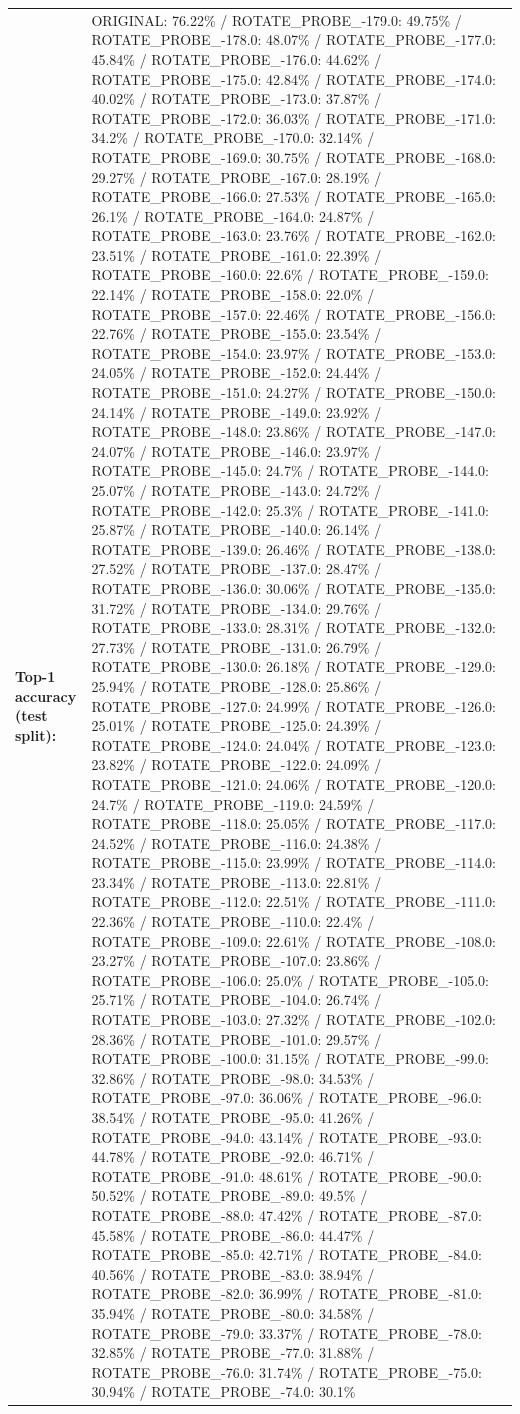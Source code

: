 \documentclass[parskip=half]{scrartcl}
\begin{document}
\begin{tabular}{l|l}
        \textbf{Top-1 accuracy (test split):} & ORIGINAL: 76.22\% / ROTATE_PROBE_-179.0: 49.75\% / ROTATE_PROBE_-178.0: 48.07\% / ROTATE_PROBE_-177.0: 45.84\% / ROTATE_PROBE_-176.0: 44.62\% / ROTATE_PROBE_-175.0: 42.84\% / ROTATE_PROBE_-174.0: 40.02\% / ROTATE_PROBE_-173.0: 37.87\% / ROTATE_PROBE_-172.0: 36.03\% / ROTATE_PROBE_-171.0: 34.2\% / ROTATE_PROBE_-170.0: 32.14\% / ROTATE_PROBE_-169.0: 30.75\% / ROTATE_PROBE_-168.0: 29.27\% / ROTATE_PROBE_-167.0: 28.19\% / ROTATE_PROBE_-166.0: 27.53\% / ROTATE_PROBE_-165.0: 26.1\% / ROTATE_PROBE_-164.0: 24.87\% / ROTATE_PROBE_-163.0: 23.76\% / ROTATE_PROBE_-162.0: 23.51\% / ROTATE_PROBE_-161.0: 22.39\% / ROTATE_PROBE_-160.0: 22.6\% / ROTATE_PROBE_-159.0: 22.14\% / ROTATE_PROBE_-158.0: 22.0\% / ROTATE_PROBE_-157.0: 22.46\% / ROTATE_PROBE_-156.0: 22.76\% / ROTATE_PROBE_-155.0: 23.54\% / ROTATE_PROBE_-154.0: 23.97\% / ROTATE_PROBE_-153.0: 24.05\% / ROTATE_PROBE_-152.0: 24.44\% / ROTATE_PROBE_-151.0: 24.27\% / ROTATE_PROBE_-150.0: 24.14\% / ROTATE_PROBE_-149.0: 23.92\% / ROTATE_PROBE_-148.0: 23.86\% / ROTATE_PROBE_-147.0: 24.07\% / ROTATE_PROBE_-146.0: 23.97\% / ROTATE_PROBE_-145.0: 24.7\% / ROTATE_PROBE_-144.0: 25.07\% / ROTATE_PROBE_-143.0: 24.72\% / ROTATE_PROBE_-142.0: 25.3\% / ROTATE_PROBE_-141.0: 25.87\% / ROTATE_PROBE_-140.0: 26.14\% / ROTATE_PROBE_-139.0: 26.46\% / ROTATE_PROBE_-138.0: 27.52\% / ROTATE_PROBE_-137.0: 28.47\% / ROTATE_PROBE_-136.0: 30.06\% / ROTATE_PROBE_-135.0: 31.72\% / ROTATE_PROBE_-134.0: 29.76\% / ROTATE_PROBE_-133.0: 28.31\% / ROTATE_PROBE_-132.0: 27.73\% / ROTATE_PROBE_-131.0: 26.79\% / ROTATE_PROBE_-130.0: 26.18\% / ROTATE_PROBE_-129.0: 25.94\% / ROTATE_PROBE_-128.0: 25.86\% / ROTATE_PROBE_-127.0: 24.99\% / ROTATE_PROBE_-126.0: 25.01\% / ROTATE_PROBE_-125.0: 24.39\% / ROTATE_PROBE_-124.0: 24.04\% / ROTATE_PROBE_-123.0: 23.82\% / ROTATE_PROBE_-122.0: 24.09\% / ROTATE_PROBE_-121.0: 24.06\% / ROTATE_PROBE_-120.0: 24.7\% / ROTATE_PROBE_-119.0: 24.59\% / ROTATE_PROBE_-118.0: 25.05\% / ROTATE_PROBE_-117.0: 24.52\% / ROTATE_PROBE_-116.0: 24.38\% / ROTATE_PROBE_-115.0: 23.99\% / ROTATE_PROBE_-114.0: 23.34\% / ROTATE_PROBE_-113.0: 22.81\% / ROTATE_PROBE_-112.0: 22.51\% / ROTATE_PROBE_-111.0: 22.36\% / ROTATE_PROBE_-110.0: 22.4\% / ROTATE_PROBE_-109.0: 22.61\% / ROTATE_PROBE_-108.0: 23.27\% / ROTATE_PROBE_-107.0: 23.86\% / ROTATE_PROBE_-106.0: 25.0\% / ROTATE_PROBE_-105.0: 25.71\% / ROTATE_PROBE_-104.0: 26.74\% / ROTATE_PROBE_-103.0: 27.32\% / ROTATE_PROBE_-102.0: 28.36\% / ROTATE_PROBE_-101.0: 29.57\% / ROTATE_PROBE_-100.0: 31.15\% / ROTATE_PROBE_-99.0: 32.86\% / ROTATE_PROBE_-98.0: 34.53\% / ROTATE_PROBE_-97.0: 36.06\% / ROTATE_PROBE_-96.0: 38.54\% / ROTATE_PROBE_-95.0: 41.26\% / ROTATE_PROBE_-94.0: 43.14\% / ROTATE_PROBE_-93.0: 44.78\% / ROTATE_PROBE_-92.0: 46.71\% / ROTATE_PROBE_-91.0: 48.61\% / ROTATE_PROBE_-90.0: 50.52\% / ROTATE_PROBE_-89.0: 49.5\% / ROTATE_PROBE_-88.0: 47.42\% / ROTATE_PROBE_-87.0: 45.58\% / ROTATE_PROBE_-86.0: 44.47\% / ROTATE_PROBE_-85.0: 42.71\% / ROTATE_PROBE_-84.0: 40.56\% / ROTATE_PROBE_-83.0: 38.94\% / ROTATE_PROBE_-82.0: 36.99\% / ROTATE_PROBE_-81.0: 35.94\% / ROTATE_PROBE_-80.0: 34.58\% / ROTATE_PROBE_-79.0: 33.37\% / ROTATE_PROBE_-78.0: 32.85\% / ROTATE_PROBE_-77.0: 31.88\% / ROTATE_PROBE_-76.0: 31.74\% / ROTATE_PROBE_-75.0: 30.94\% / ROTATE_PROBE_-74.0: 30.1\% 
\end{tabular}
\end{document}
